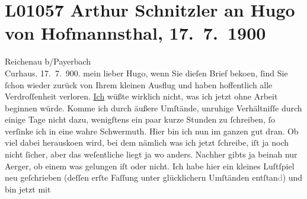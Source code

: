 

\section[Arthur Schnitzler an Hugo von Hofmannsthal, 17. 7. 1900]{L01057 Arthur Schnitzler an Hugo von Hofmannsthal, 17. 7. 1900}
\nopagebreak{}
\rehead{ }\normalsize\beginnumbering{}
\toendnotes[C]{\smallbreak\pagebreak[2]}
\toendnotes[C]{\smallbreak}
\pstart
           \raggedleft{}{\pb}Reichenau b/Payerbach{\\}Curhaus.
                     17. 7. 900. \pend
           \vspace{0.5em}
\pstart
           mein lieber Hugo, wenn Sie dieſen Brief beko{\geminationm}en, ſind Sie ſchon wieder zurück von Ihrem kleinen
               Ausflug und haben hoffentlich \introOben{}alle\introOben{} Verdroſſenheit verloren.
                  \uline{Ich} wüßte wirklich nicht, was ich jetzt ohne
               Arbeit beginnen würde. Komme ich durch äußere Umſtände, unruhige Verhältniſſe durch
               einige Tage nicht dazu, wenigſtens ein paar kurze Stunden zu ſchreiben, ſo verſinke
               ich in eine wahre Schwermuth. Hier bin ich nun im ganzen {\pb}gut dran. Ob viel dabei herausko{\geminationm}en wird, bei dem
               nämlich was ich jetzt ſchreibe, iſt ja noch nicht ſicher, aber das weſentliche liegt
               ja wo anders. Nachher gibts ja beinah nur Aerger, ob einem was gelungen iſt oder
               nicht. Ich habe hier ein kleines Luſtſpiel neu geſchrieben (deſſen erſte Faſſung \label{K_L01057-1v}\label{K_L01057-1} unter glücklichern Umſtänden entſtan\textcolor{gray}{d}) und bin jetzt mit
